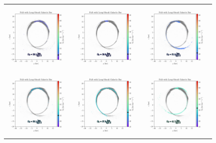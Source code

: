 \begin{figure}
\begin{tabular}{ccc}
                \includegraphics[width=.32\linewidth]{images/frame_0016.png}&
                \includegraphics[width=.32\linewidth]{images/frame_0019.png}&
                \includegraphics[width=.32\linewidth]{images/frame_0023.png}\\
                
                \includegraphics[width=.32\linewidth]{images/frame_0038.png}&
                \includegraphics[width=.32\linewidth]{images/frame_0048.png}&
                \includegraphics[width=.32\linewidth]{images/frame_0062.png}\\
                

\end{tabular}
\end{figure}
